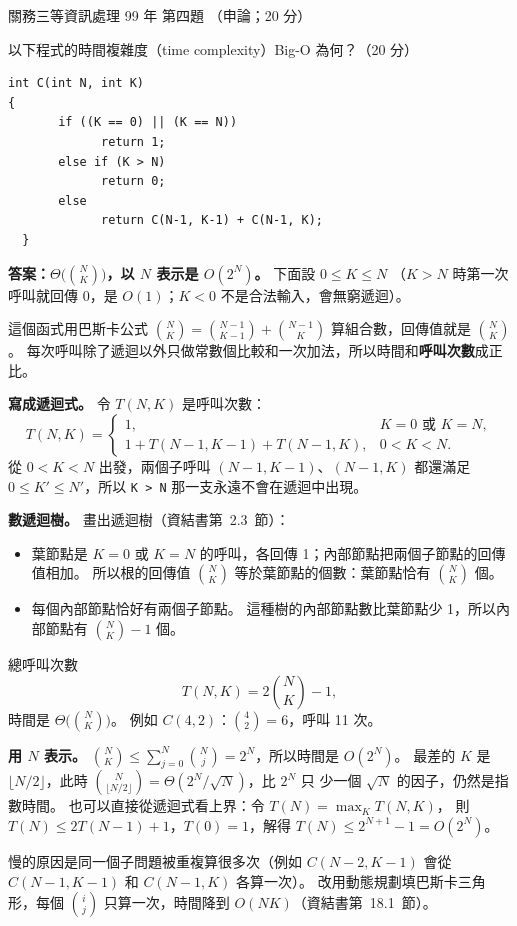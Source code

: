 \begin{pastexam}[label={px:gw3-099-ds-03}]{關務三等資訊處理 99 年 第四題}
（申論；20 分）

以下程式的時間複雜度（time complexity）Big-O 為何？（20 分）
\begin{verbatim}
int C(int N, int K)
{
       if ((K == 0) || (K == N))
             return 1;
       else if (K > N)
             return 0;
       else
             return C(N-1, K-1) + C(N-1, K);
  }
\end{verbatim}
\end{pastexam}

\begin{pastsoln}
\textbf{答案：$\Theta\bigl(\binom{N}{K}\bigr)$，以 $N$ 表示是 $O(2^N)$。} 下面設 $0 \le K \le N$
（$K > N$ 時第一次呼叫就回傳 0，是 $O(1)$；$K < 0$ 不是合法輸入，會無窮遞迴）。

這個函式用巴斯卡公式 $\binom{N}{K} = \binom{N-1}{K-1} + \binom{N-1}{K}$ 算組合數，回傳值就是
$\binom{N}{K}$。 每次呼叫除了遞迴以外只做常數個比較和一次加法，所以時間和\textbf{呼叫次數}成正比。

\textbf{寫成遞迴式。} 令 $T(N, K)$ 是呼叫次數：
\[
T(N, K) = \begin{cases}
1, & K = 0 \text{ 或 } K = N, \\
1 + T(N-1, K-1) + T(N-1, K), & 0 < K < N.
\end{cases}
\]
從 $0 < K < N$ 出發，兩個子呼叫 $(N-1, K-1)$、$(N-1, K)$ 都還滿足 $0 \le K' \le N'$，所以
\texttt{K > N} 那一支永遠不會在遞迴中出現。

\textbf{數遞迴樹。} 畫出遞迴樹（資結書第~2.3~節）：
\begin{itemize}
\item 葉節點是 $K = 0$ 或 $K = N$ 的呼叫，各回傳 1；內部節點把兩個子節點的回傳值相加。 所以根的回傳值
$\binom{N}{K}$ 等於葉節點的個數：葉節點恰有 $\binom{N}{K}$ 個。
\item 每個內部節點恰好有兩個子節點。 這種樹的內部節點數比葉節點少 1，所以內部節點有 $\binom{N}{K} - 1$ 個。
\end{itemize}
總呼叫次數
\[
T(N, K) = 2\binom{N}{K} - 1,
\]
時間是 $\Theta\bigl(\binom{N}{K}\bigr)$。 例如 $C(4, 2)$：$\binom{4}{2} = 6$，呼叫 11 次。

\textbf{用 $N$ 表示。} $\binom{N}{K} \le \sum_{j=0}^{N} \binom{N}{j} = 2^N$，所以時間是 $O(2^N)$。
最差的 $K$ 是 $\lfloor N/2 \rfloor$，此時 $\binom{N}{\lfloor N/2 \rfloor} = \Theta(2^N / \sqrt{N})$，比 $2^N$ 只
少一個 $\sqrt{N}$ 的因子，仍然是指數時間。 也可以直接從遞迴式看上界：令 $T(N) = \max_K T(N, K)$，
則 $T(N) \le 2T(N-1) + 1$，$T(0) = 1$，解得 $T(N) \le 2^{N+1} - 1 = O(2^N)$。

慢的原因是同一個子問題被重複算很多次（例如 $C(N-2, K-1)$ 會從 $C(N-1, K-1)$ 和 $C(N-1, K)$ 各算一次）。
改用動態規劃填巴斯卡三角形，每個 $\binom{i}{j}$ 只算一次，時間降到 $O(NK)$（資結書第~18.1~節）。
\end{pastsoln}
